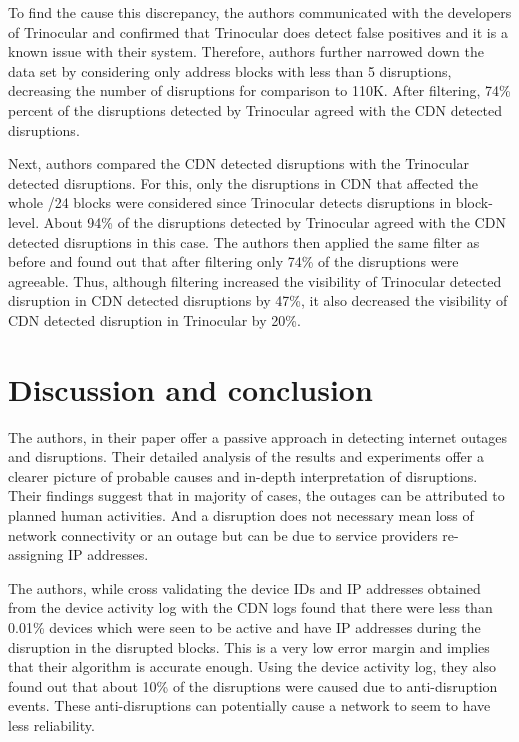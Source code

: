 \documentclass[11pt,twoside,a4paper]{article}
\begin{document}
To find the cause this discrepancy, the authors communicated with the developers of Trinocular and confirmed that Trinocular does detect false positives and it is a known issue with their system. Therefore, authors further narrowed down the data set by considering only address blocks with less than 5 disruptions, decreasing the number of disruptions for comparison to 110K. After filtering, 74\% percent of the disruptions detected by Trinocular agreed with the CDN detected disruptions.

Next, authors compared the CDN detected disruptions with the Trinocular detected disruptions. For this, only the disruptions in CDN that affected the whole /24 blocks were considered since Trinocular detects disruptions in block-level. About 94\% of the disruptions detected by Trinocular agreed with the CDN detected disruptions in this case. The authors then applied the same filter as before and found out that after filtering only 74\% of the disruptions were agreeable. Thus, although filtering increased the visibility of Trinocular detected disruption in CDN detected disruptions by 47\%, it also decreased the visibility of CDN detected disruption in Trinocular by 20\%.

\section{Discussion and conclusion} \label{DC}
The authors, in their paper offer a passive approach in detecting internet outages and disruptions. Their detailed analysis of the results and experiments offer a clearer picture of probable causes and in-depth interpretation of disruptions. Their findings suggest that in majority of cases, the outages can be attributed to planned human activities. And a disruption does not necessary mean loss of network connectivity or an outage but can be due to service providers re-assigning IP addresses.

The authors, while cross validating the device IDs and IP addresses obtained from the device activity log with the CDN logs found that there were less than 0.01\% devices which were seen to be active and have IP addresses during the disruption in the disrupted blocks. This is a very low error margin and implies that their algorithm is accurate enough. Using the device activity log, they also found out that about 10\% of the disruptions were caused due to anti-disruption events. These anti-disruptions can potentially cause a network to seem to have less reliability.
\end{document}
